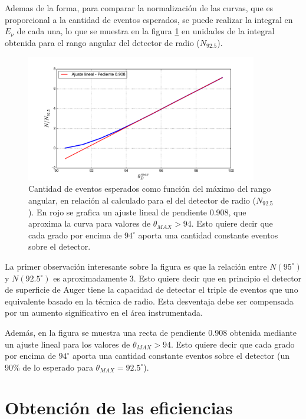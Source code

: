 	Ademas de la forma, para comparar la normalizaci\'on de las curvas, que es proporcional a la cantidad de eventos esperados, se puede realizar la integral en $E_\nu$ de cada una, lo que se muestra en la figura \ref{fig:gainThetas} en unidades de la integral obtenida para el rango angular del detector de radio ($N_{92.5}$). 
	\begin{figure}[h!]
		\begin{center}
			\includegraphics[width=0.9\textwidth]{fig/resultadosRadio/eventGain_thetas}
			\caption{\label{fig:gainThetas} Cantidad de eventos esperados como funci\'on del m\'aximo del rango angular, en relaci\'on al calculado para el del detector de radio ($N_{92.5}$).
			En rojo se grafica un ajuste lineal de pendiente 0.908, que aproxima la curva para valores de $\theta_{MAX}>94$.
			Esto quiere decir que cada grado por encima de $94^\circ$ aporta una cantidad constante eventos sobre el detector.
			}
		\end{center}
	\end{figure}
	La primer observaci\'on interesante sobre la figura es que la relaci\'on entre $N(95^\circ)$ y $N(92.5^\circ)$ es aproximadamente 3.
	Esto quiere decir que en principio el detector de superficie de Auger tiene la capacidad de detectar el triple de eventos que uno equivalente basado en la t\'ecnica de radio.
	Esta desventaja debe ser compensada por un aumento significativo en el \'area instrumentada.
	
	Adem\'as, en la figura se muestra una recta de pendiente 0.908 obtenida mediante un ajuste lineal para los valores de $\theta_{MAX}>94$.
	Esto quiere decir que cada grado por encima de $94^\circ$ aporta una cantidad constante eventos sobre el detector (un $90\%$ de lo esperado para $\theta_{MAX}=92.5^\circ$).
	
\section{Obtenci\'on de las eficiencias}
\label{sc:effRadio}

